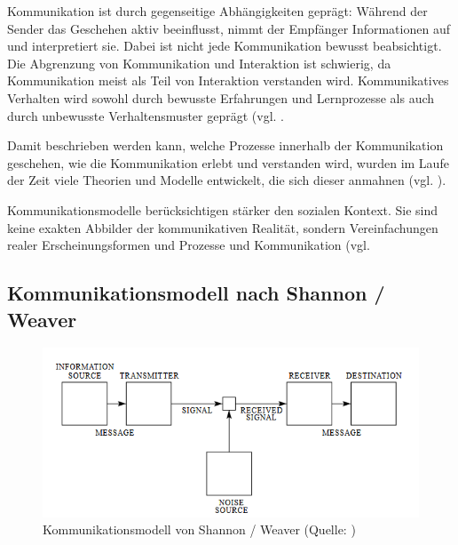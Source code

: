Kommunikation ist durch gegenseitige Abhängigkeiten geprägt: Während der Sender das Geschehen aktiv beeinflusst, nimmt der Empfänger Informationen auf und interpretiert sie. Dabei ist nicht jede Kommunikation bewusst beabsichtigt. Die Abgrenzung von Kommunikation und Interaktion ist schwierig, da Kommunikation meist als Teil von Interaktion verstanden wird. Kommunikatives Verhalten wird sowohl durch bewusste Erfahrungen und Lernprozesse als auch durch unbewusste Verhaltensmuster geprägt (vgl. \cite[S. 20]{becker_praxishandbuch_2018}.

Damit beschrieben werden kann, welche Prozesse innerhalb der Kommunikation geschehen, wie die Kommunikation erlebt und verstanden wird, wurden im Laufe der Zeit viele Theorien und Modelle entwickelt, die sich dieser anmahnen (vgl. \cite[S. 311]{schwarz_grundlagen_2019}).

Kommunikationsmodelle berücksichtigen stärker den sozialen Kontext. Sie sind keine exakten Abbilder der kommunikativen Realität, sondern Vereinfachungen realer Erscheinungsformen und Prozesse und Kommunikation (vgl. \cite[S. 56]{maletzke_kommunikationswissenschaft_1998}

\subsection{Kommunikationsmodell nach Shannon / Weaver}

\begin{figure}[ht]
\centering
\includegraphics[width=1\linewidth]{content/pictures/shannon-weaver.PNG}
\caption{Kommunikationsmodell von Shannon / Weaver (Quelle: \cite[S. 2]{shannon_mathematical_1948})}
\label{fig:shannon-weaver-modell}
\end{figure}

